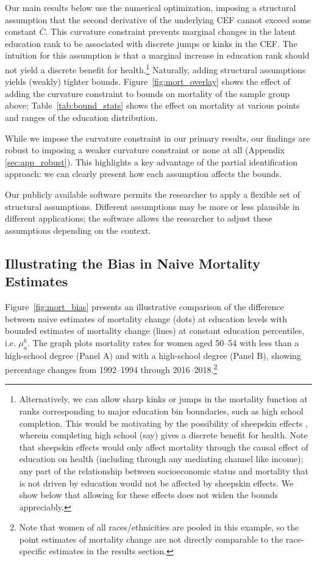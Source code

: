 \documentclass[12pt,letterpaper]{article}
\numberwithin{equation}{section}
\begin{document}
Our main results below use the numerical optimization, imposing a structural assumption that the second derivative of the underlying CEF cannot exceed some constant $\overline{C}$. This curvature constraint prevents marginal changes in the latent education rank to be associated with discrete jumps or kinks in the CEF.  The intuition for this assumption is that a marginal increase in education rank should not yield a discrete benefit for health.\footnote{Alternatively, we can allow sharp kinks or jumps in the mortality function at ranks corresponding to major education bin boundaries, such as high school completion. This would be motivating by the possibility of sheepskin effects \citep{hungerford1987}, wherein completing high school (say) gives a discrete benefit for health. Note that sheepskin effects would only affect mortality through the causal effect of education on health (including through any mediating channel like income); any part of the relationship between socioeconomic status and mortality that is not driven by education would not be affected by sheepskin effects. We show below that allowing for these effects does not widen the bounds appreciably.} Naturally, adding structural assumptions yields (weakly) tighter bounds. Figure~\ref{fig:mort_overlay} shows the effect of adding the curvature constraint to bounds on mortality of the sample group above; Table~\ref{tab:bound_stats} shows the effect on mortality at various points and ranges of the education distribution.

While we impose the curvature constraint in our primary results, our findings are robust to imposing a weaker curvature constraint or none at all (Appendix \ref{sec:app_robust}). This highlights a key advantage of the partial identification approach: we can clearly present how each assumption affects the bounds.

Our publicly available software permits the researcher to apply a flexible set of structural assumptions. Different assumptions may be more or less plausible in different applications; the software allows the researcher to adjust these assumptions depending on the context.

\subsection{Illustrating the Bias in Naive Mortality Estimates} 
\label{sec:bias}

Figure~\ref{fig:mort_bias} presents an illustrative comparison of the difference between naive estimates of mortality change (dots) at education levels with bounded estimates of mortality change (lines) at constant education percentiles, i.e. $\mu_a^b$. The graph plots mortality rates for women aged 50--54 with less than a high-school degree (Panel A) and with a high-school degree (Panel B), showing percentage changes from 1992--1994 through 2016--2018.\footnote{Note that women of all races/ethnicities are pooled in this example, so the point estimates of mortality change are not directly comparable to the race-specific estimates in the results section.} 
\end{document}
